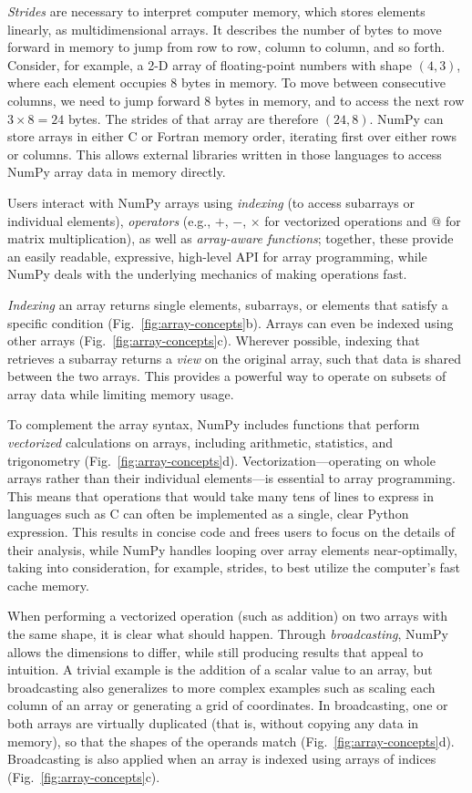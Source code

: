 \documentclass[twocolumn]{article}
\begin{document}
\emph{Strides} are necessary to interpret computer memory, which stores elements
linearly, as multidimensional arrays.
It describes the number of bytes to move forward in memory to jump from row to
row, column to column, and so forth.
Consider, for example, a 2-D array of floating-point numbers with shape
$(4, 3)$, where each element occupies 8 bytes in memory.
To move between consecutive columns, we need to jump forward 8 bytes in memory,
and to access the next row $3 \times 8 = 24$ bytes.
The strides of that array are therefore $(24, 8)$.  NumPy can
store arrays in either C or Fortran memory order, iterating
first over either rows or columns.  This allows external libraries
written in those languages to access NumPy array data in memory directly.

Users interact with NumPy arrays using {\em indexing} (to access
subarrays or individual elements), {\em operators} (e.g., $+$, $-$, $\times$
for vectorized operations and $@$ for matrix multiplication), as well as {\em array-aware functions};
together, these provide an easily readable, expressive, high-level API for
array programming, while NumPy
deals with the underlying mechanics of making operations fast.

\emph{Indexing} an array returns single elements, subarrays, or elements that satisfy
a specific condition (Fig.~\ref{fig:array-concepts}b).
Arrays can even be indexed using other arrays (Fig.~\ref{fig:array-concepts}c).
Wherever possible, indexing that retrieves a subarray returns a {\em view} on
the original array, such that data is shared between the two arrays.
This provides a powerful way to operate on subsets of array data while
limiting memory usage.

To complement the array syntax, NumPy includes functions that perform
\emph{vectorized} calculations on arrays, including arithmetic, statistics, and
trigonometry (Fig.~\ref{fig:array-concepts}d).
Vectorization---operating on whole arrays rather than their individual
elements---is essential to array programming.
This means that operations that would take many tens of lines to express in
languages such as C can often be implemented as a single, clear Python
expression.
This results in concise code and frees users to focus on the details of
their analysis, while NumPy handles looping over array elements near-optimally,
taking into consideration, for example, strides, to best utilize the
computer's fast cache memory.

When performing a vectorized operation (such as addition) on two arrays with
the same shape, it is clear what should happen.
Through \emph{broadcasting}, NumPy allows the dimensions to differ, while
still producing results that appeal to intuition.
A trivial example is the addition of a scalar value to an array, but broadcasting also
generalizes to more complex examples such as scaling each column of an array
or generating a grid of coordinates.
In broadcasting, one or both arrays are virtually duplicated (that is, without
copying any data in memory), so that the shapes of the operands match
(Fig.~\ref{fig:array-concepts}d).
Broadcasting is also applied when an array is indexed using arrays of
indices (Fig.~\ref{fig:array-concepts}c).
\end{document}
